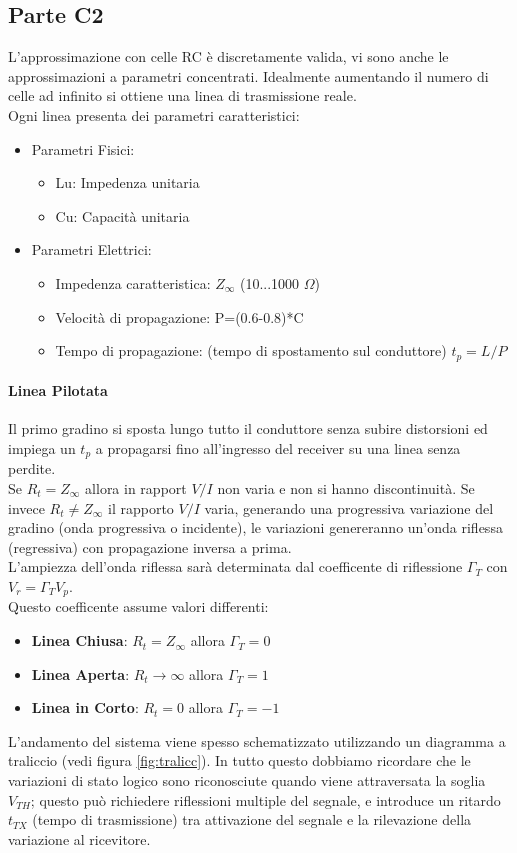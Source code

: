\documentclass[12pt]{article}
\begin{document}
\subsection{Parte C2}\label{c2}
L'approssimazione con celle RC è discretamente valida, vi sono anche le approssimazioni a parametri concentrati. Idealmente aumentando il numero di celle ad infinito si ottiene una linea di trasmissione reale.\\
Ogni linea presenta dei parametri caratteristici:
\begin{itemize}
  \item Parametri Fisici:
  \begin{itemize}
    \item Lu: Impedenza unitaria
    \item Cu: Capacità unitaria
  \end{itemize}
  \item Parametri Elettrici:
  \begin{itemize}
    \item Impedenza caratteristica: $Z_{\infty}$ (10...1000 $\Omega$)
    \item Velocità di propagazione: P=(0.6-0.8)*C
    \item Tempo di propagazione: (tempo di spostamento sul conduttore) $t_{p}=L/P$
  \end{itemize}
\end{itemize}

\paragraph{Linea Pilotata} Il primo gradino si sposta lungo tutto il conduttore senza subire distorsioni ed impiega un $t_{p}$ a propagarsi fino all'ingresso del receiver su una linea senza perdite.\\
Se $R_{t}=Z_{\infty}$ allora in rapport $V/I$ non varia e non si hanno discontinuità. Se invece $R_{t} \neq Z_{\infty}$ il rapporto $V/I$ varia, generando una progressiva variazione del gradino (onda progressiva o incidente), le variazioni genereranno un'onda riflessa (regressiva) con propagazione inversa a prima.\\
L'ampiezza dell'onda riflessa sarà determinata dal coefficente di riflessione $\Gamma_{T}$ con $V_{r}=\Gamma_{T}V_{p}$.\\
Questo coefficente assume valori differenti:
\begin{itemize}
  \item \textbf{Linea Chiusa}: $R_{t}=Z_{\infty}$ allora $\Gamma_{T}=0$
  \item \textbf{Linea Aperta}: $R_{t}\rightarrow\infty$ allora $\Gamma_{T}=1$
  \item \textbf{Linea in Corto}: $R_{t}=0$ allora $\Gamma_{T}=-1$
\end{itemize}
L'andamento del sistema viene spesso schematizzato utilizzando un diagramma a traliccio (vedi figura \ref{fig:tralicc}). In tutto questo dobbiamo ricordare che le variazioni di stato logico sono riconosciute quando viene attraversata la soglia $V_{TH}$; questo può richiedere riflessioni multiple del segnale, e introduce un ritardo $t_{TX}$ (tempo di trasmissione) tra attivazione del segnale e la rilevazione della variazione al ricevitore.
\end{document}
